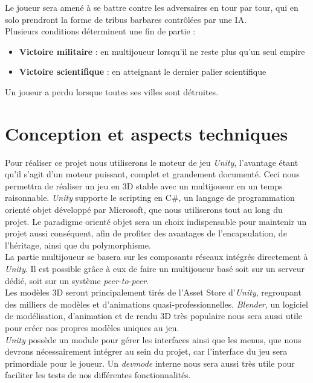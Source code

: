 \documentclass[12pt]{report}
\begin{document}
Le joueur sera amené à se battre contre les adversaires en tour par tour, qui en solo prendront la forme de tribus barbares contrôlées par une IA.\\

Plusieurs conditions déterminent une fin de partie :

\begin{itemize}[label=\textbullet]
\item \textbf{Victoire militaire} : en multijoueur lorsqu’il ne reste plus qu’un seul empire
\item \textbf{Victoire scientifique} : en atteignant le dernier palier scientifique
\end{itemize}

Un joueur a perdu lorsque toutes ses villes sont détruites.

\chapter{Conception et aspects techniques}

Pour réaliser ce projet nous utiliserons le moteur de jeu \textit{Unity}, l'avantage étant qu’il s’agit d’un moteur puissant, complet et grandement documenté. Ceci nous permettra de réaliser un jeu en 3D stable avec un multijoueur en un temps raisonnable. \textit{Unity} supporte le scripting en C#, un langage de programmation orienté objet développé par Microsoft, que nous utiliserons tout au long du projet. Le paradigme orienté objet sera un choix indispensable pour maintenir un projet aussi conséquent, afin de profiter des avantages de l’encapsulation, de l’héritage, ainsi que du polymorphisme.\\

La partie multijoueur se basera sur les composants réseaux intégrés directement à \textit{Unity}. Il est possible grâce à eux de faire un multijoueur basé soit sur un serveur dédié, soit sur un système \textit{peer-to-peer}.\\

Les modèles 3D seront principalement tirés de l’Asset Store d’\textit{Unity}, regroupant des milliers de modèles et d’animations quasi-professionnelles. \textit{Blender}, un logiciel de modélisation, d’animation et de rendu 3D très populaire nous sera aussi utile pour créer nos propres modèles uniques au jeu.\\

\textit{Unity} possède un module pour gérer les interfaces ainsi que les menus, que nous devrons nécessairement intégrer au sein du projet, car l’interface du jeu sera primordiale pour le joueur. Un \textit{devmode} interne nous sera aussi très utile pour faciliter les tests de nos différentes fonctionnalités.\\
\end{document}
